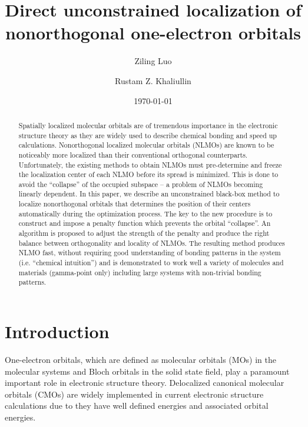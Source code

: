 \documentclass[aps,prl,reprint,amsmath,amssymb]{revtex4-1}
\begin{document}



\title{
Direct unconstrained localization of nonorthogonal one-electron orbitals
}

\author{Ziling Luo}
\author{Rustam Z. Khaliullin}

\date{\today}

\begin{abstract}
Spatially localized molecular orbitals are of tremendous importance in the electronic structure theory as they are widely used to describe chemical bonding and speed up calculations.
Nonorthogonal localized molecular orbitals (NLMOs) are known to be noticeably more localized than their conventional orthogonal counterparts. 
Unfortunately, the existing methods to obtain NLMOs must pre-determine and freeze the localization center of each NLMO before its spread is minimized. 
This is done to avoid the “collapse” of the occupied subspace – a problem of NLMOs becoming linearly dependent. 
In this paper, we describe an unconstrained black-box method to localize nonorthogonal orbitals that determines the position of their centers automatically during the optimization process. 
The key to the new procedure is to construct and impose a penalty function which prevents the orbital “collapse”. 
An algorithm is proposed to adjust the strength of the penalty and produce the right balance between orthogonality and locality of NLMOs. 
The resulting method produces NLMO fast, without requiring good understanding of bonding patterns in the system (i.e. “chemical intuition”) and is demonstrated to work well a variety of molecules and materials (gamma-point only) including large systems with non-trivial bonding patterns. 
\end{abstract}

\maketitle

\section{Introduction} 


One-electron orbitals, which are defined as molecular orbitals (MOs) in the molecular systems and Bloch orbitals in the solid state field, play a paramount important role in electronic structure theory. 
Delocalized canonical molecular orbitals (CMOs) are widely implemented in current electronic structure calculations due to they have well defined energies and associated orbital energies. 
\end{document}
